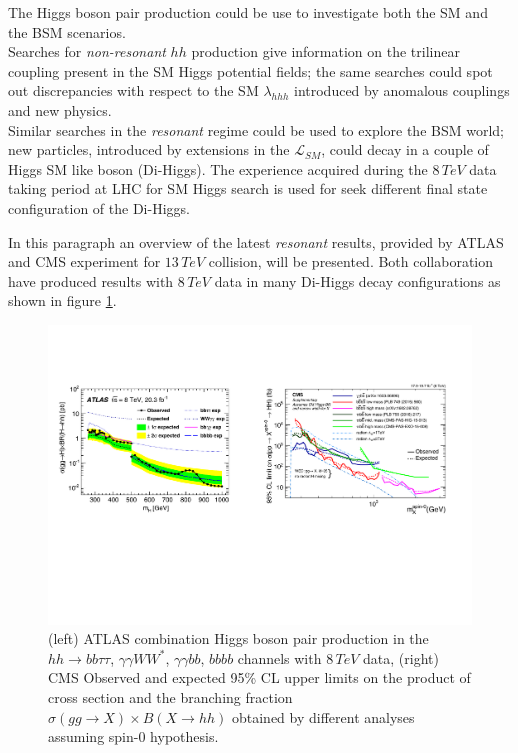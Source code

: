 \label{ref:HHProduction}

The Higgs boson pair production could be use to investigate both the SM and the BSM scenarios. 
\\
Searches for \emph{non-resonant} $hh$ production give information on the trilinear coupling present in the SM Higgs potential fields; the same searches could spot out discrepancies with respect to the SM $\lambda_{hhh}$ introduced by anomalous couplings and new physics.
\\
Similar searches in the \emph{resonant} regime could be used to explore the BSM world; new particles, introduced by extensions in the $\mathcal{L}_{SM}$, could decay in a couple of Higgs SM like boson (Di-Higgs). The experience acquired during the $8 \, TeV$ data taking period at LHC for SM Higgs search is used for seek different final state configuration of the Di-Higgs. 

In this paragraph an overview of the latest \emph{resonant} results, provided by ATLAS and CMS experiment for  $13\, TeV$ collision, will be presented. Both collaboration have produced results with $8\, TeV$ data \cite{HH_ATLAS_8TeV}\cite{HH_CMS_8TeV} 
in many Di-Higgs decay configurations as shown in figure \ref{fig:HH_8TeV_Results}.
 
\begin{figure}[htb]
\centering
	\includegraphics[width=1.0\textwidth, angle=0] {figures/HH_8TeV.pdf}
\caption{(left) ATLAS combination Higgs boson pair production in the $hh\ensuremath{\rightarrow}bb\ensuremath{\tau}\ensuremath{\tau}$, $\ensuremath{\gamma}\ensuremath{\gamma}W{W}^{*}$, $\ensuremath{\gamma}\ensuremath{\gamma}bb$, $bbbb$ channels with $8\,TeV$ data, (right) CMS Observed and expected 95\% CL upper limits on the product of cross section and the branching fraction $\sigma(gg\rightarrow X) \times B(X\rightarrow hh)$ obtained by different analyses assuming spin-0 hypothesis.}
\label{fig:HH_8TeV_Results}   
\end{figure}

